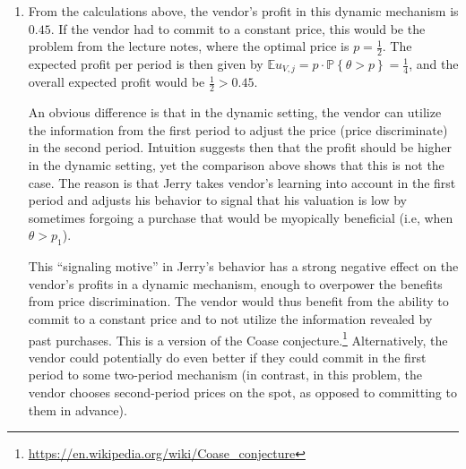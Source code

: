 \documentclass[a4paper]{article}
\begin{document}
\begin{enumerate}
	\item From the calculations above, the vendor's profit in this dynamic mechanism is $0.45$. If the vendor had to commit to a constant price, this would be the problem from the lecture notes, where the optimal price is $p = \frac{1}{2}$. The expected profit per period is then given by $\mathbb{E}u_{V,j} = p \cdot \mathbb{P} \left\{ \theta > p \right\} = \frac{1}{4}$, and the overall expected profit would be $\frac{1}{2} > 0.45$.
	
	An obvious difference is that in the dynamic setting, the vendor can utilize the information from the first period to adjust the price (price discriminate) in the second period. Intuition suggests then that the profit should be higher in the dynamic setting, yet the comparison above shows that this is not the case. The reason is that Jerry takes vendor's learning into account in the first period and adjusts his behavior to signal that his valuation is low by sometimes forgoing a purchase that would be myopically beneficial (i.e, when $\theta > p_1$).
	
	This ``signaling motive'' in Jerry's behavior has a strong negative effect on the vendor's profits in a dynamic mechanism, enough to overpower the benefits from price discrimination. The vendor would thus benefit from the ability to commit to a constant price and to not utilize the information revealed by past purchases. This is a version of the Coase conjecture.\footnote{\url{https://en.wikipedia.org/wiki/Coase_conjecture}}
	Alternatively, the vendor could potentially do even better if they could commit in the first period to some two-period mechanism (in contrast, in this problem, the vendor chooses second-period prices on the spot, as opposed to committing to them in advance).
\end{enumerate}

\fi 
\end{document}
